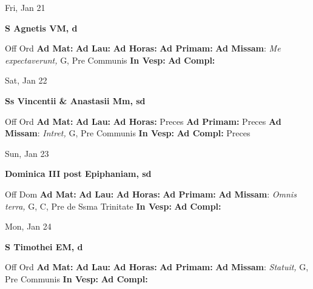 \documentclass[10pt]{article}
\begin{document}
\begin{minipage}{3.5in}
\vspace{2em}\begin{center}
Fri, Jan 21
\end{center}\textbf{ \large S Agnetis VM, \textnormal{\normalsize d}}
\begin{justify}
Off Ord
\textbf{Ad Mat: }
\textbf{Ad Lau: }
\textbf{Ad Horas: }
\textbf{Ad Primam: }
\textbf{Ad Missam}: \textit{Me expectaverunt,} G, Pre Communis
\textbf{In Vesp: }
\textbf{Ad Compl: }\end{justify}
\end{minipage}



\begin{minipage}{3.5in}
\vspace{2em}\begin{center}
Sat, Jan 22
\end{center}\textbf{ \large Ss Vincentii \& Anastasii Mm, \textnormal{\normalsize sd}}
\begin{justify}
Off Ord
\textbf{Ad Mat: }
\textbf{Ad Lau: }
\textbf{Ad Horas: }Preces
\textbf{Ad Primam: }Preces
\textbf{Ad Missam}: \textit{Intret,} G, Pre Communis
\textbf{In Vesp: }
\textbf{Ad Compl: }Preces\end{justify}
\end{minipage}



\begin{minipage}{3.5in}
\vspace{2em}\begin{center}
Sun, Jan 23
\end{center}\textbf{ \large Dominica III post Epiphaniam, \textnormal{\normalsize sd}}
\begin{justify}
Off Dom
\textbf{Ad Mat: }
\textbf{Ad Lau: }
\textbf{Ad Horas: }
\textbf{Ad Primam: }
\textbf{Ad Missam}: \textit{Omnis terra,} G, C, Pre de Ssma Trinitate
\textbf{In Vesp: }
\textbf{Ad Compl: }\end{justify}
\end{minipage}



\begin{minipage}{3.5in}
\vspace{2em}\begin{center}
Mon, Jan 24
\end{center}\textbf{ \large S Timothei EM, \textnormal{\normalsize d}}
\begin{justify}
Off Ord
\textbf{Ad Mat: }
\textbf{Ad Lau: }
\textbf{Ad Horas: }
\textbf{Ad Primam: }
\textbf{Ad Missam}: \textit{Statuit,} G, Pre Communis
\textbf{In Vesp: }
\textbf{Ad Compl: }\end{justify}
\end{minipage}
\end{document}
